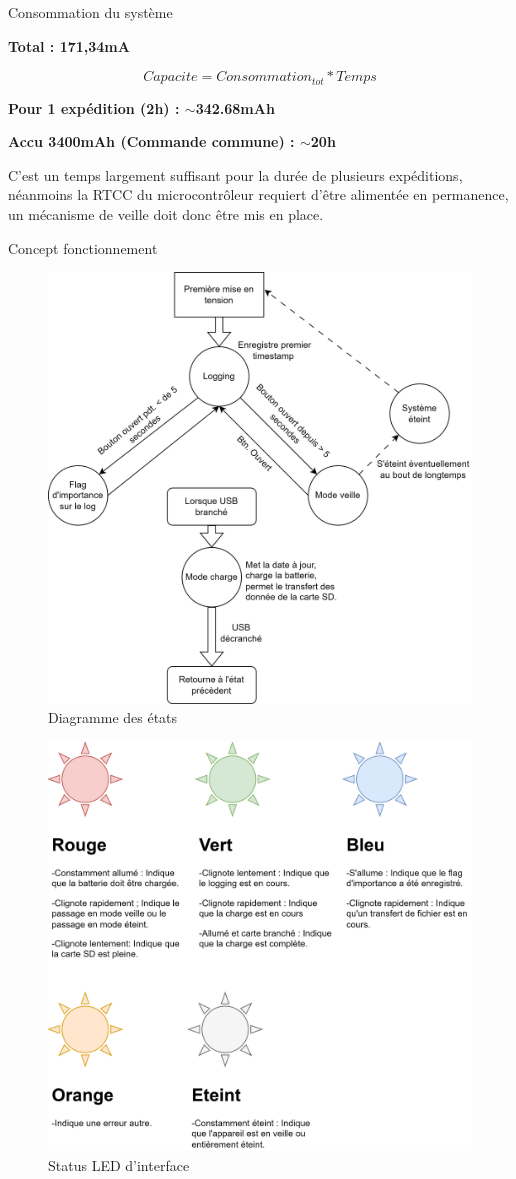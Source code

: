 \documentclass[compress,aspectratio=169]{beamer}
\begin{document}
\begin{frame}[containsverbatim]{Consommation du système}
	\begin{center}
		   \fbox{\textit{\textcolor{red}{Carte-SD - 100mA}}}    
	\end{center}
	\textbf{Total : 171,34mA}

	\begin{equation}
		Capacite = Consommation_{tot} * Temps
	\end{equation}
	
	\textbf{Pour 1 expédition (2h) : $\sim$342.68mAh}
	
	\textbf{Accu 3400mAh (Commande commune) : $\sim$20h}
	
	C’est un temps largement suffisant pour la durée de plusieurs expéditions,
	néanmoins la RTCC du microcontrôleur requiert d’être alimentée
	en permanence, un mécanisme de veille doit donc être mis en place.
\end{frame}

\begin{frame}[containsverbatim]{Concept fonctionnement}
	\begin{figure}
		\centering
		\includegraphics[width=0.5\linewidth]{Images/Dev-SCH/Etats_diagramme}
		\caption{Diagramme des états}
		\label{fig:etatsdiagramme}
	\end{figure}
\end{frame}
 
\begin{frame}
	\begin{figure}
		\centering
		\includegraphics[width=0.55\linewidth]{Images/Dev-SCH/LEDStates}
		\caption{Status LED d'interface}
		\label{fig:ledstates}
	\end{figure}
\end{frame}
	
\end{document}
